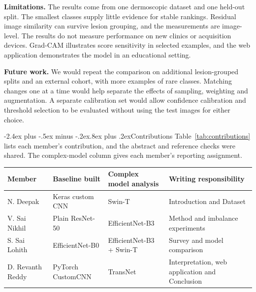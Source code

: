 \documentclass[11pt,a4paper]{article}
\makeatletter
\renewcommand{\arraystretch}{1.19}
\renewcommand\section{\@startsection{section}{1}{\z@}%
  {-2.4ex plus -.5ex minus -.2ex}{.8ex plus .2ex}{\sffamily\Large\bfseries\color{teal}}}
\makeatother
\begin{document}
\textbf{Limitations.} The results come from one dermoscopic dataset and one held-out split. The smallest classes supply little evidence for stable rankings. Residual image similarity can survive lesion grouping, and the measurements are image-level. The results do not measure performance on new clinics or acquisition devices. Grad-CAM illustrates score sensitivity in selected examples, and the web application demonstrates the model in an educational setting.

\textbf{Future work.} We would repeat the comparison on additional lesion-grouped splits and an external cohort, with more examples of rare classes. Matching changes one at a time would help separate the effects of sampling, weighting and augmentation. A separate calibration set would allow confidence calibration and threshold selection to be evaluated without using the test images for either choice.

\clearpage
\begingroup
{}
\providecommand{\doi}[1]{\href{https://doi.org/#1}{\nolinkurl{#1}}}
\renewcommand{\bibsection}{\section{References}}
\renewcommand{\bibfont}{\footnotesize}
\setlength{\bibsep}{0pt}


\endgroup

\par\begin{minipage}{\linewidth}
\section{Contributions}
Table~\ref{tab:contributions} lists each member's contribution, and the abstract and reference checks were shared. The complex-model column gives each member's reporting assignment.

\smallskip
\begin{minipage}{\linewidth}
\label{tab:contributions}
\small
\renewcommand{\arraystretch}{1.12}
\begin{tabularx}{\linewidth}{@{}L{.157\linewidth}L{.171\linewidth}L{.156\linewidth}Y@{}}
\toprule
Member & Baseline built & Complex model analysis & Writing responsibility\\
\midrule
N. Deepak & Keras custom CNN & Swin-T & Introduction and Dataset\\
V. Sai Nikhil & Plain ResNet-50 & EfficientNet-B3 & Method and imbalance experiments\\
S. Sai Lohith & EfficientNet-B0 & EfficientNet-B3 + Swin-T & Survey and model comparison\\
D. Revanth Reddy & PyTorch CustomCNN & TransNet & Interpretation, web application and Conclusion\\
\bottomrule
\end{tabularx}
\end{minipage}
\end{minipage}
\end{document}
